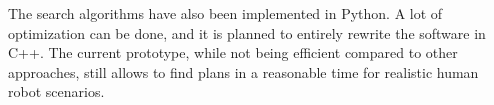 \documentclass[a4paper,11pt,twoside]{StyleThese}
\begin{document}
The search algorithms have also been implemented in Python. A lot of optimization can be done, and it is planned to entirely rewrite the software in C++. The current prototype, while not being efficient compared to other approaches, still allows to find plans in a reasonable time for realistic human robot scenarios.

\end{document}
